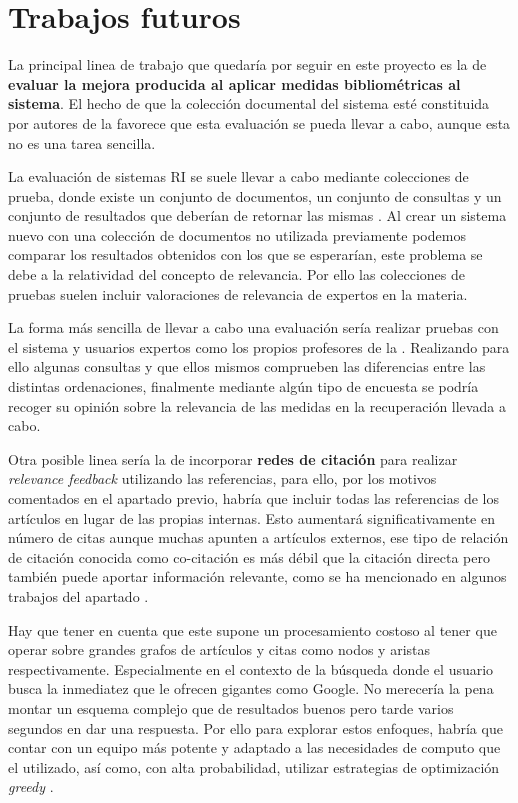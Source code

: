 \section{Trabajos futuros}

La principal linea de trabajo que quedaría por seguir en este proyecto es la de \textbf{evaluar la mejora producida al aplicar medidas bibliométricas al sistema}. El hecho de que la colección documental del sistema esté constituida por autores de la \myFaculty favorece que esta evaluación se pueda llevar a cabo, aunque esta no es una tarea sencilla. 

La evaluación de sistemas \acrshort{RI} se suele llevar a cabo mediante colecciones de prueba, donde existe un conjunto de documentos, un conjunto de consultas y un conjunto de resultados que deberían de retornar las mismas \cite{RI_Evaluation}. Al crear un sistema nuevo con una colección de documentos no utilizada previamente podemos comparar los resultados obtenidos con los que se esperarían, este problema se debe a la relatividad del concepto de relevancia. Por ello las colecciones de pruebas suelen incluir valoraciones de relevancia de expertos en la materia.

La forma más sencilla de llevar a cabo una evaluación sería realizar pruebas con el sistema y usuarios expertos como los propios profesores de la \myFaculty. Realizando para ello algunas consultas y que ellos mismos comprueben las diferencias entre las distintas ordenaciones, finalmente mediante algún tipo de encuesta se podría recoger su opinión sobre la relevancia de las medidas en la recuperación llevada a cabo.

Otra posible linea sería la de incorporar \textbf{redes de citación} para realizar \textit{relevance feedback} \cite{relevanceFeedback} utilizando las referencias, para ello, por los motivos comentados en el apartado previo, habría que incluir todas las referencias de los artículos en lugar de las propias internas. Esto aumentará significativamente en número de citas aunque muchas apunten a artículos externos, ese tipo de relación de citación conocida como co-citación es más débil que la citación directa pero también puede aportar información relevante, como se ha mencionado en algunos trabajos del apartado . 

Hay que tener en cuenta que este supone un procesamiento costoso al tener que operar sobre grandes grafos de artículos y citas como nodos y aristas respectivamente. Especialmente en el contexto de la búsqueda donde el usuario busca la inmediatez que le ofrecen gigantes como Google. No merecería la pena montar un esquema complejo que de resultados buenos pero tarde varios segundos en dar una respuesta. Por ello para explorar estos enfoques, habría que contar con un equipo más potente y adaptado a las necesidades de computo que el utilizado, así como, con alta probabilidad, utilizar estrategias de optimización \textit{greedy} \cite{greedy}.
